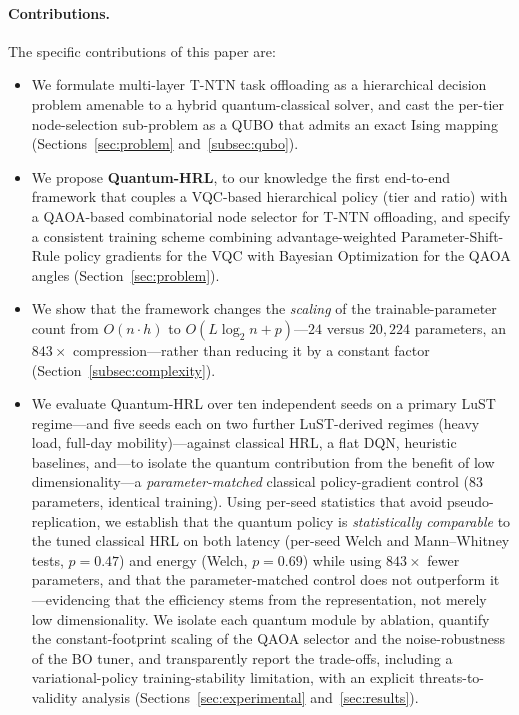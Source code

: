 \documentclass[11pt,a4paper]{article}
\theoremstyle{definition}
\begin{document}
\paragraph{Contributions.}
The specific contributions of this paper are:
\begin{itemize}
  \item We formulate multi-layer T-NTN task offloading as a hierarchical decision problem amenable to a hybrid quantum-classical solver, and cast the per-tier node-selection sub-problem as a QUBO that admits an exact Ising mapping (Sections~\ref{sec:problem} and~\ref{subsec:qubo}).
  \item We propose \textbf{Quantum-HRL}, to our knowledge the first end-to-end framework that couples a VQC-based hierarchical policy (tier and ratio) with a QAOA-based combinatorial node selector for T-NTN offloading, and specify a consistent training scheme combining advantage-weighted Parameter-Shift-Rule policy gradients for the VQC with Bayesian Optimization for the QAOA angles (Section~\ref{sec:problem}).
  \item We show that the framework changes the \emph{scaling} of the trainable-parameter count from $O(n\cdot h)$ to $O(L\log_2 n + p)$---$24$ versus $20{,}224$ parameters, an $843\times$ compression---rather than reducing it by a constant factor (Section~\ref{subsec:complexity}).
  \item We evaluate Quantum-HRL over ten independent seeds on a primary LuST regime---and five seeds each on two further LuST-derived regimes (heavy load, full-day mobility)---against classical HRL, a flat DQN, heuristic baselines, and---to isolate the quantum contribution from the benefit of low dimensionality---a \emph{parameter-matched} classical policy-gradient control ($83$ parameters, identical training). Using per-seed statistics that avoid pseudo-replication, we establish that the quantum policy is \emph{statistically comparable} to the tuned classical HRL on both latency (per-seed Welch and Mann--Whitney tests, $p=0.47$) and energy (Welch, $p=0.69$) while using $843\times$ fewer parameters, and that the parameter-matched control does not outperform it---evidencing that the efficiency stems from the representation, not merely low dimensionality. We isolate each quantum module by ablation, quantify the constant-footprint scaling of the QAOA selector and the noise-robustness of the BO tuner, and transparently report the trade-offs, including a variational-policy training-stability limitation, with an explicit threats-to-validity analysis (Sections~\ref{sec:experimental} and~\ref{sec:results}).
\end{itemize}
\end{document}
